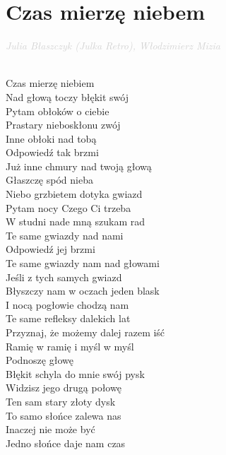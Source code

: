 \documentclass[a5paper, 10pt]{book}
\begin{document}
\newpage
\section{Czas mierzę niebem}\textcolor{lightgray}{\textit{Julia Błaszczyk (Julka Retro), Włodzimierz Mizia\\}}~\\
\begin{minipage}[t]{0.6\textwidth}
  Czas mierzę niebiem			\\
  Nad głową toczy błękit swój			\\
  Pytam obłoków o ciebie			\\
  Prastary nieboskłonu zwój		\\
  Inne obłoki nad tobą			\\
  Odpowiedź tak brzmi			\\
  Już inne chmury nad twoją głową			\\

  Głaszczę spód nieba\\
  Niebo grzbietem dotyka gwiazd\\
  Pytam nocy Czego Ci trzeba\\
  W studni nade mną szukam rad\\
  Te same gwiazdy nad nami\\
  Odpowiedź jej brzmi\\
  Te same gwiazdy nam nad głowami\\

  Jeśli z tych samych gwiazd		\\
  Błyszczy nam w oczach jeden blask\\
  I nocą pogłowie chodzą nam		\\
  Te same refleksy dalekich lat		\\
  Przyznaj, że możemy dalej razem iść\\
  Ramię w ramię i myśl w myśl				\\

  Podnoszę głowę				\\
  Błękit schyla do mnie swój pysk		\\
  Widzisz jego drugą połowę			\\
  Ten sam stary złoty dysk			\\
  To samo słońce zalewa nas		\\
  Inaczej nie może być			\\
  Jedno słońce daje nam czas				\\
\end{minipage}
\end{document}
